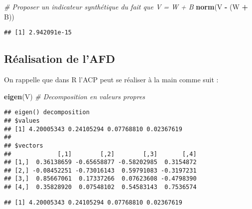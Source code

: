 \documentclass[
]{article}
\newenvironment{Shaded}{\begin{snugshade}}{\end{snugshade}}
\newcommand{\CommentTok}[1]{\textcolor[rgb]{0.56,0.35,0.01}{\textit{#1}}}
\newcommand{\DataTypeTok}[1]{\textcolor[rgb]{0.13,0.29,0.53}{#1}}
\newcommand{\DecValTok}[1]{\textcolor[rgb]{0.00,0.00,0.81}{#1}}
\newcommand{\KeywordTok}[1]{\textcolor[rgb]{0.13,0.29,0.53}{\textbf{#1}}}
\newcommand{\NormalTok}[1]{#1}
\newcommand{\OperatorTok}[1]{\textcolor[rgb]{0.81,0.36,0.00}{\textbf{#1}}}
\newcommand{\StringTok}[1]{\textcolor[rgb]{0.31,0.60,0.02}{#1}}
\begin{document}
\begin{Shaded}
\begin{Highlighting}[]
\CommentTok{# Proposer un indicateur synthétique du fait que V = W + B}
\KeywordTok{norm}\NormalTok{(V }\OperatorTok{-}\StringTok{ }\NormalTok{(W }\OperatorTok{+}\StringTok{ }\NormalTok{B)) }
\end{Highlighting}
\end{Shaded}

\begin{verbatim}
## [1] 2.942091e-15
\end{verbatim}

\hypertarget{ruxe9alisation-de-lafd}{%
\subsection{Réalisation de l'AFD}\label{ruxe9alisation-de-lafd}}

On rappelle que dans R l'ACP peut se réaliser à la main comme suit :

\begin{Shaded}
\begin{Highlighting}[]
\KeywordTok{eigen}\NormalTok{(V) }\CommentTok{# Decomposition en valeurs propres}
\end{Highlighting}
\end{Shaded}

\begin{verbatim}
## eigen() decomposition
## $values
## [1] 4.20005343 0.24105294 0.07768810 0.02367619
## 
## $vectors
##             [,1]        [,2]        [,3]       [,4]
## [1,]  0.36138659 -0.65658877 -0.58202985  0.3154872
## [2,] -0.08452251 -0.73016143  0.59791083 -0.3197231
## [3,]  0.85667061  0.17337266  0.07623608 -0.4798390
## [4,]  0.35828920  0.07548102  0.54583143  0.7536574
\end{verbatim}

\begin{Shaded}
\end{Shaded}

\begin{verbatim}
## [1] 4.20005343 0.24105294 0.07768810 0.02367619
\end{verbatim}

\begin{Shaded}
\end{Shaded}
\end{document}
